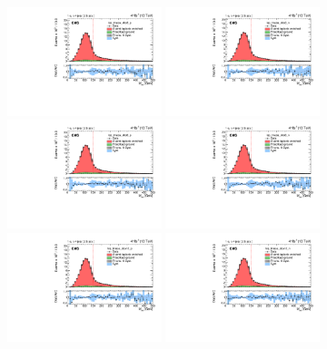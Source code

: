 \begin{figure}
    \centering
    \includegraphics[width=0.4\textwidth]{figure/FitResult_17_el_lep_tmass_obs3_p_chi2_20.pdf}
    \includegraphics[width=0.4\textwidth]{figure/FitResult_17_el_lep_tmass_obs3_n_chi2_20.pdf}
    \includegraphics[width=0.4\textwidth]{figure/FitResult_17_el_lep_tmass_obs6_p_chi2_20.pdf}
    \includegraphics[width=0.4\textwidth]{figure/FitResult_17_el_lep_tmass_obs6_n_chi2_20.pdf}
    \includegraphics[width=0.4\textwidth]{figure/FitResult_17_el_lep_tmass_obs12_p_chi2_20.pdf}
    \includegraphics[width=0.4\textwidth]{figure/FitResult_17_el_lep_tmass_obs12_n_chi2_20.pdf}

\end{figure}
